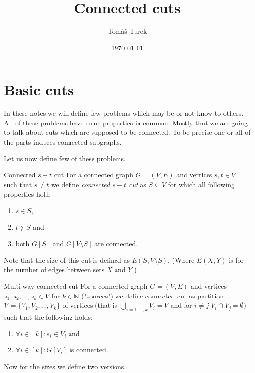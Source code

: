 \documentclass{article}
\title{Connected cuts}
\author{Tomáš Turek}
\date{\today}
\begin{document}
	\maketitle
	
	\section{Basic cuts}
	
	In these notes we will define few problems which may be or not know to others. All of these problems have some properties in common. Mostly that we are going to talk about cuts which are supposed to be connected. To be precise one or all of the parts induces connected subgraphs.
	
	Let us now define few of these problems.
	
	\begin{defn}{Connected $s-t$ cut}
		For a connected graph $G = (V,E)$ and vertices $s,t \in V$ such that $s\neq t$ we define \textit{connected $s-t$ cut} as $S \subseteq V$ for which all following properties hold:
		
		\begin{enumerate}
			\item $s \in S$,
			\item $t \notin S$ and
			\item both $G[S]$ and $G[V \setminus S]$ are connected.
		\end{enumerate}
	\end{defn}

	Note that the size of this cut is defined as $E(S, V \setminus S)$. (Where $E(X,Y)$ is for the number of edges between sets $X$ and $Y$.)
	
	\begin{defn}{Multi-way connected cut}
		For a connected graph $G = (V,E)$ and vertices $s_1, s_2, \dots, s_k \in V$ for $k \in \mathbb{N}$ ("sources") we define connected cut as partition $\mathcal{V} = \{V_1, V_2, \dots, V_k\}$ of vertices (that is $\bigcup_{i = 1, \dots, k} V_i = V$ and for $i \neq j$ $V_i \cap V_j = \emptyset$) such that the following holds:
		
		\begin{enumerate}
			\item $\forall i \in [k]: s_i \in V_i$ and
			\item $\forall i \in [k]: G[V_i]$ is connected.
		\end{enumerate}
	\end{defn}

	Now for the sizes we define two versions.
	
\end{document}
